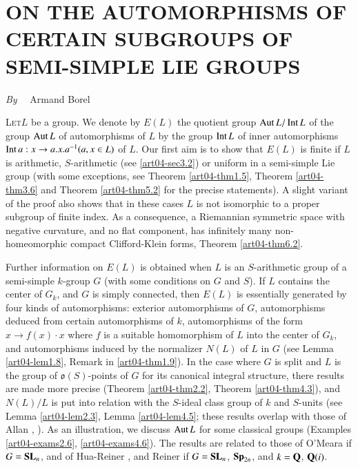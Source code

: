 \chapter[\textsc{A. Borel} : On the Automorphisms of Certain Subgroups of Semi-Simple Lie Groups]{ON THE AUTOMORPHISMS OF CERTAIN SUBGROUPS OF SEMI-SIMPLE LIE GROUPS}\label{art04}

\begin{center}
{\em By}~~ Armand Borel
\end{center}


\setcounter{pageoriginal}{42}
\textsc{Let}\pageoriginale $L$ be a group. We denote by $E(L)$ the quotient group $\operatorname{\mathrm{Aut}} L/\operatorname{\mathrm{Int}} L$ of the group $\operatorname{\mathrm{Aut}} L$ of automorphisms of $L$ by the group $\operatorname{\mathrm{Int}} L$ of inner automorphisms $\operatorname{\mathrm{Int}} a:x\to a.x.a^{-1}(a,x\in L)$ of $L$. Our first aim is to show that $E(L)$ is finite if $L$ is arithmetic, $S$-arithmetic (see \ref{art04-sec3.2}) or uniform in a semi-simple Lie group (with some exceptions, see Theorem \ref{art04-thm1.5}, Theorem \ref{art04-thm3.6} and Theorem \ref{art04-thm5.2} for the precise statements). A slight variant of the proof also shows that in these cases $L$ is not isomorphic to a proper subgroup of finite index. As a consequence, a Riemannian symmetric space with negative curvature, and no flat component, has infinitely many non-homeomorphic compact Clifford-Klein forms, Theorem \ref{art04-thm6.2}.

\smallskip

Further information on $E(L)$ is obtained when $L$ is an $S$-arithmetic group of a semi-simple $k$-group $G$ (with some conditions on $G$ and $S$). If $L$ contains the center of $G_{k}$, and $G$ is simply connected, then $E(L)$ is essentially generated by four kinds of automorphisms: exterior automorphisms of $G$, automorphisms deduced from certain automorphisms of $k$, automorphisms of the form $x\to f(x)\cdot x$ where $f$ is a suitable homomorphism of $L$ into the center of $G_{k}$, and automorphisms induced by the normalizer $N(L)$ of $L$ in $G$ (see Lemma \ref{art04-lem1.8}, Remark in \ref{art04-thm1.9}). In the case where $G$ is split and $L$ is the group of $\mathfrak{o}(S)$-points of $G$ for its canonical integral structure, there results are made more precise (Theorem \ref{art04-thm2.2}, Theorem \ref{art04-thm4.3}), and $N(L)/L$ is put into relation with the $S$-ideal class group of $k$ and $S$-units (see Lemma \ref{art04-lem2.3}, Lemma \ref{art04-lem4.5}; these results overlap with those of Allan \cite{art04-key1}, \cite{art04-key2}). As an illustration, we discuss $\operatorname{\mathrm{Aut}} L$ for some classical groups (Examples \ref{art04-exams2.6}, \ref{art04-exams4.6}). The results are related to those of O'Meara \cite{art04-key24} if $G=\mathbf{SL}_{n}$, and of Hua-Reiner \cite{art04-key12}, \cite{art04-key13} and Reiner \cite{art04-key27} if $G=\mathbf{SL}_{n}$, $\mathbf{Sp}_{2n}$, and $k=\mathbf{Q}$, $\mathbf{Q}(i)$.


